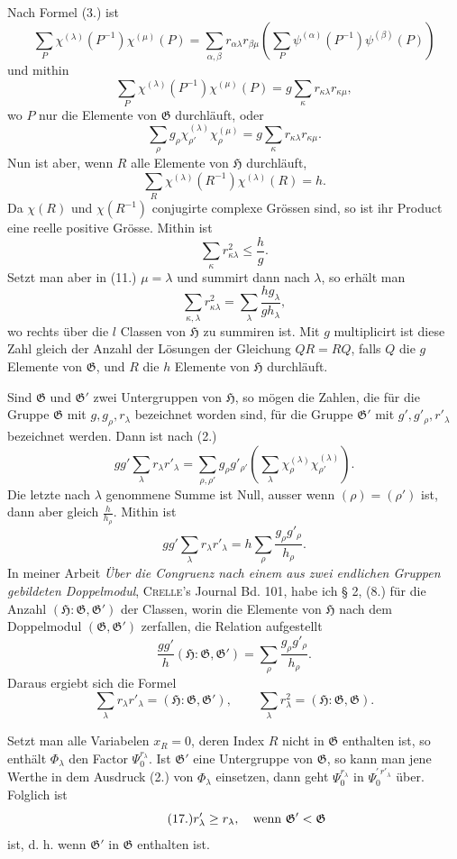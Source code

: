 \documentclass[11pt]{article}
\newcommand{\Hgr}{\mathfrak{H}}
\newcommand{\Ggr}{\mathfrak{G}}
\begin{document}
Nach Formel (3.) ist
\[
  \sum_P \chi^{(\lambda)}(P^{-1})\chi^{(\mu)}(P)
  =
  \sum_{\alpha,\beta} r_{\alpha\lambda}r_{\beta\mu}
  \left(\sum_P\psi^{(\alpha)}(P^{-1})\psi^{(\beta)}(P)\right)
\]
und mithin
\[
\tag{11.}
  \sum_P \chi^{(\lambda)}(P^{-1})\chi^{(\mu)}(P)
  =
  g\sum_\kappa r_{\kappa\lambda}r_{\kappa\mu},
\]
wo $P$ nur die Elemente von $\Ggr$ durchläuft, oder
\[
\tag{12.}
  \sum_\rho g_\rho\chi_{\rho'}^{(\lambda)}\chi_{\rho}^{(\mu)}
  =
  g\sum_\kappa r_{\kappa\lambda}r_{\kappa\mu}.
\]
Nun ist aber, wenn $R$ alle Elemente von $\Hgr$ durchläuft,
\[
  \sum_R \chi^{(\lambda)}(R^{-1})\chi^{(\lambda)}(R)=h.
\]
Da $\chi(R)$ und $\chi(R^{-1})$ conjugirte complexe Grössen sind, so ist ihr Product eine reelle positive Grösse. Mithin ist
\[
\tag{13.}
  \sum_\kappa r_{\kappa\lambda}^{2}\le \frac{h}{g}.
\]
Setzt man aber in (11.) $\mu=\lambda$ und summirt dann nach $\lambda$, so erhält man
\[
\tag{14.}
  \sum_{\kappa,\lambda}r_{\kappa\lambda}^{2}
  =
  \sum_\lambda \frac{h g_\lambda}{g h_\lambda},
\]
wo rechts über die $l$ Classen von $\Hgr$ zu summiren ist. Mit $g$ multiplicirt ist diese Zahl gleich der Anzahl der Lösungen der Gleichung $QR=RQ$, falls $Q$ die $g$ Elemente von $\Ggr$, und $R$ die $h$ Elemente von $\Hgr$ durchläuft.

Sind $\Ggr$ und $\Ggr'$ zwei Untergruppen von $\Hgr$, so mögen die Zahlen, die für die Gruppe $\Ggr$ mit $g,g_\rho,r_\lambda$ bezeichnet worden sind, für die Gruppe $\Ggr'$ mit $g',g'_\rho,r'_\lambda$ bezeichnet werden. Dann ist nach (2.)
\[
  gg'\sum_\lambda r_\lambda r'_\lambda
  =
  \sum_{\rho,\rho'}g_\rho g'_{\rho'}
  \left(\sum_\lambda \chi_\rho^{(\lambda)}\chi_{\rho'}^{(\lambda)}\right).
\]
Die letzte nach $\lambda$ genommene Summe ist Null, ausser wenn $(\rho)=(\rho')$ ist, dann aber gleich $\frac{h}{h_\rho}$. Mithin ist
\[
  gg'\sum_\lambda r_\lambda r'_\lambda
  =
  h\sum_\rho\frac{g_\rho g'_\rho}{h_\rho}.
\]
In meiner Arbeit \emph{Über die Congruenz nach einem aus zwei endlichen Gruppen gebildeten Doppelmodul}, \textsc{Crelle}'s Journal Bd. 101, habe ich § 2, (8.) für die Anzahl $(\Hgr:\Ggr,\Ggr')$ der Classen, worin die Elemente von $\Hgr$ nach dem Doppelmodul $(\Ggr,\Ggr')$ zerfallen, die Relation aufgestellt
\[
\tag{15.}
  \frac{gg'}{h}(\Hgr:\Ggr,\Ggr')
  =
  \sum_\rho\frac{g_\rho g'_\rho}{h_\rho}.
\]
Daraus ergiebt sich die Formel
\[
\tag{16.}
  \sum_\lambda r_\lambda r'_\lambda=(\Hgr:\Ggr,\Ggr'),
  \qquad
  \sum_\lambda r_\lambda^{2}=(\Hgr:\Ggr,\Ggr).
\]

Setzt man alle Variabelen $x_R=0$, deren Index $R$ nicht in $\Ggr$ enthalten ist, so enthält $\Phi_\lambda$ den Factor $\Psi_0^{r_\lambda}$. Ist $\Ggr'$ eine Untergruppe von $\Ggr$, so kann man jene Werthe in dem Ausdruck (2.) von $\Phi_\lambda$ einsetzen, dann geht $\Psi_0^{r_\lambda}$ in $\Psi_0^{\prime\,r'_\lambda}$ über. Folglich ist
\[
\tag{17.}
  r'_\lambda\ge r_\lambda,\quad\hbox{wenn }\Ggr'<\Ggr
\]
ist, d. h. wenn $\Ggr'$ in $\Ggr$ enthalten ist.
\end{document}
